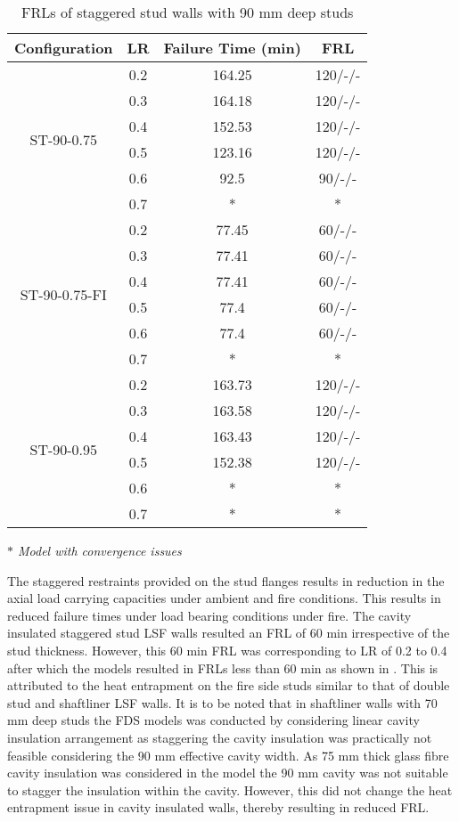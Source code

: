 \begin{table}[!htbp]
	\centering
	\caption{FRLs of staggered stud walls with 90 mm deep studs}
	  \begin{tabular}{cccc}
	  \toprule
	  Configuration & LR    & Failure Time (min) & FRL \\
	  \midrule
	  \multirow{6}[2]{*}{ST-90-0.75} & 0.2   & 164.25 & 120/-/- \\
			& 0.3   & 164.18 & 120/-/- \\
			& 0.4   & 152.53 & 120/-/- \\
			& 0.5   & 123.16 & 120/-/- \\
			& 0.6   & 92.5  & 90/-/- \\
			& 0.7   & *     & * \\
	  \midrule
	  \multirow{6}[2]{*}{ST-90-0.75-FI} & 0.2   & 77.45 & 60/-/- \\
			& 0.3   & 77.41 & 60/-/- \\
			& 0.4   & 77.41 & 60/-/- \\
			& 0.5   & 77.4  & 60/-/- \\
			& 0.6   & 77.4  & 60/-/- \\
			& 0.7   & *     & * \\
	  \midrule
	  \multirow{6}[2]{*}{ST-90-0.95} & 0.2   & 163.73 & 120/-/- \\
			& 0.3   & 163.58 & 120/-/- \\
			& 0.4   & 163.43 & 120/-/- \\
			& 0.5   & 152.38 & 120/-/- \\
			& 0.6   & *     & * \\
			& 0.7   & *     & * \\
	  \bottomrule
	  \end{tabular}%
	\label{tab:frl-parametric-st-90}%

	\small \textit{$*$ Model with convergence issues}
\end{table}%

The staggered restraints provided on the stud flanges results in reduction in the axial load carrying capacities under ambient and fire conditions. This results in reduced failure times under load bearing conditions under fire. The cavity insulated staggered stud LSF walls resulted an FRL of 60 min irrespective of the stud thickness. However, this 60 min FRL was corresponding to LR of 0.2 to 0.4 after which the models resulted in FRLs less than 60 min as shown in . This is attributed to the heat entrapment on the fire side studs similar to that of double stud and shaftliner LSF walls. It is to be noted that in shaftliner walls with 70 mm deep studs the FDS models was conducted by considering linear cavity insulation arrangement as staggering the cavity insulation was practically not feasible considering the 90 mm effective cavity width. As 75 mm thick glass fibre cavity insulation was considered in the model the 90 mm cavity was not suitable to stagger the insulation within the cavity. However, this did not change the heat entrapment issue in cavity insulated walls, thereby resulting in reduced FRL. 


